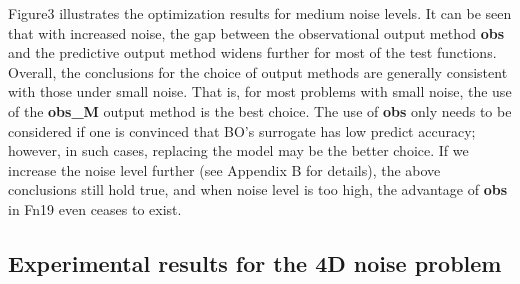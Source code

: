 \documentclass{article}
\begin{document}
\hspace{2em}Figure3 illustrates the optimization results for medium noise levels. It can be seen that with increased noise, the gap between the observational output method \textbf{obs} and the predictive output method widens further for most of the test functions. Overall, the conclusions for the choice of output methods are generally consistent with those under small noise. That is, for most problems with small noise, the use of the \textbf{obs\_M} output method is the best choice. The use of \textbf{obs} only needs to be considered if one is convinced that BO's surrogate has low predict accuracy; however, in such cases, replacing the model may be the better choice. If we increase the noise level further (see Appendix B for details), the above conclusions still hold true, and when noise level is too high, the advantage of \textbf{obs} in Fn19 even ceases to exist.

\subsection{Experimental results for the 4D noise problem}
\end{document}
